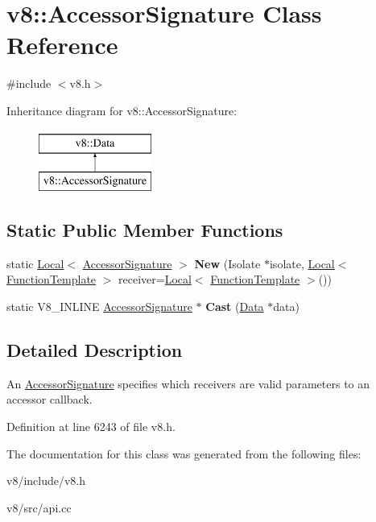 \hypertarget{classv8_1_1AccessorSignature}{}\section{v8\+:\+:Accessor\+Signature Class Reference}
\label{classv8_1_1AccessorSignature}


{\ttfamily \#include $<$v8.\+h$>$}

Inheritance diagram for v8\+:\+:Accessor\+Signature\+:\begin{figure}[H]
\begin{center}
\leavevmode
\includegraphics[height=2.000000cm]{classv8_1_1AccessorSignature}
\end{center}
\end{figure}
\subsection*{Static Public Member Functions}
\begin{DoxyCompactItemize}
\item 
\mbox{\label{classv8_1_1AccessorSignature_a0a35126433259c49bab4d3ac6756dd67}} 
static \mbox{\hyperlink{classv8_1_1Local}{Local}}$<$ \mbox{\hyperlink{classv8_1_1AccessorSignature}{Accessor\+Signature}} $>$ {\bfseries New} (Isolate $\ast$isolate, \mbox{\hyperlink{classv8_1_1Local}{Local}}$<$ \mbox{\hyperlink{classv8_1_1FunctionTemplate}{Function\+Template}} $>$ receiver=\mbox{\hyperlink{classv8_1_1Local}{Local}}$<$ \mbox{\hyperlink{classv8_1_1FunctionTemplate}{Function\+Template}} $>$())
\item 
\mbox{\label{classv8_1_1AccessorSignature_add2ad5697fb3b13d63de9d1e96db3758}} 
static V8\+\_\+\+I\+N\+L\+I\+NE \mbox{\hyperlink{classv8_1_1AccessorSignature}{Accessor\+Signature}} $\ast$ {\bfseries Cast} (\mbox{\hyperlink{classv8_1_1Data}{Data}} $\ast$data)
\end{DoxyCompactItemize}


\subsection{Detailed Description}
An \mbox{\hyperlink{classv8_1_1AccessorSignature}{Accessor\+Signature}} specifies which receivers are valid parameters to an accessor callback. 

Definition at line 6243 of file v8.\+h.



The documentation for this class was generated from the following files\+:\begin{DoxyCompactItemize}
\item 
v8/include/v8.\+h\item 
v8/src/api.\+cc\end{DoxyCompactItemize}

